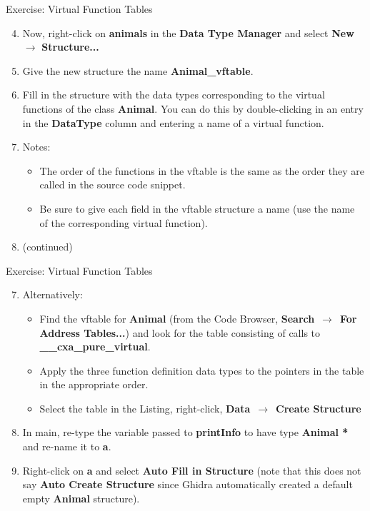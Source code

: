 \documentclass{beamer}
\begin{document}
\begin{frame}
\begin{block}{Exercise: Virtual Function Tables}
\begin{enumerate}
\setcounter{enumi}{3}
\item Now, right-click on \textbf{animals} in the \textbf{Data Type Manager} and select \textbf{New} $\rightarrow$ \textbf{Structure...}
\item Give the new structure the name \textbf{Animal\_vftable}.
\item Fill in the structure with the data types corresponding to the virtual functions of the class \textbf{Animal}.  You can do this by double-clicking in an entry in
the \textbf{DataType} column and entering a name of a virtual function.
\item[] Notes:
\begin{itemize}
\item The order of the functions in the vftable is the same as the order they are called in the source code snippet.
\item Be sure to give each field in the vftable structure a name (use the name of the corresponding virtual function).
\end{itemize}
\item[] (continued)
\end{enumerate}
\end{block}
\end{frame}

\begin{frame}
\begin{block}{Exercise: Virtual Function Tables}
\begin{enumerate}
\setcounter{enumi}{6}
\item Alternatively:
\begin{itemize}
\item Find the vftable for \textbf{Animal} (from the Code Browser, \textbf{Search}~$\rightarrow$~\textbf{For Address Tables...}) and look for the table consisting of calls to
\textbf{\_\_cxa\_pure\_virtual}.
\item Apply the three function definition data types to the pointers in the table in the appropriate order.
\item Select the table in the Listing, right-click, \textbf{Data}~$\rightarrow$~\textbf{Create Structure}
\end{itemize}
\item In main, re-type the variable passed to \textbf{printInfo} to have type \textbf{Animal *} and re-name it to \textbf{a}.
\item Right-click on \textbf{a} and select \textbf{Auto Fill in Structure} (note that this does not say \textbf{Auto Create Structure} since Ghidra automatically created a default empty
\textbf{Animal} structure).
\end{enumerate}
\end{block}
\end{frame}
\end{document}
